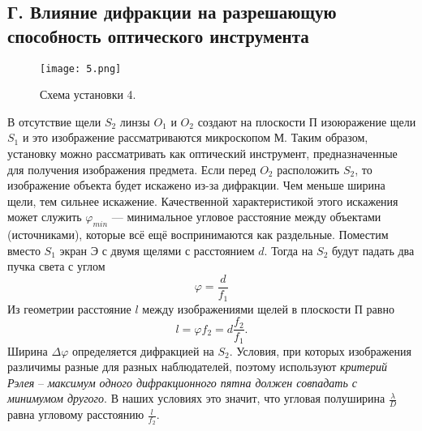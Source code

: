 \subsection*{Г. Влияние дифракции на разрешающую способность оптического инструмента}
\begin{figure}[h]
	\texttt{[image: 5.png]}
	\centering
	\caption{Схема установки 4.}
\end{figure}
В отсутствие щели $S_2$ линзы $O_1$ и $O_2$ создают на плоскости П изоюражение щели $S_1$ и это изображение рассматриваются микроскопом М. Таким образом, установку можно рассматривать как оптический инструмент, предназначенные для получения изображения предмета. Если перед $O_2$ расположить $S_2$, то изображение объекта будет искажено из-за дифракции. Чем меньше ширина щели, тем сильнее искажение. Качественной характеристикой этого искажения может служить $\varphi_{min}$ --- минимальное угловое расстояние между объектами (источниками), которые всё ещё воспринимаются как раздельные. Поместим вместо $S_1$ экран Э с двумя щелями с расстоянием $d$. Тогда на $S_2$ будут падать два пучка света с углом
\begin{equation}
	\varphi = \dfrac{d}{f_1}
\end{equation}
Из геометрии расстояние $l$ между изображениями щелей в плоскости П равно
\begin{equation}
	l = \varphi f_2 = d \dfrac{f_2}{f_1}.
\end{equation}
Ширина $\Delta \varphi$ определяется дифракцией на $S_2$. Условия, при которых изображения различимы разные для разных наблюдателей, поэтому используют \textit{критерий Рэлея} -- \textit{максимум одного дифракционного пятна должен совпадать с минимумом другого}. В наших условиях это значит, что угловая полуширина $\frac{\lambda}{D}$ равна угловому расстоянию $\frac{l}{f_2}$.
